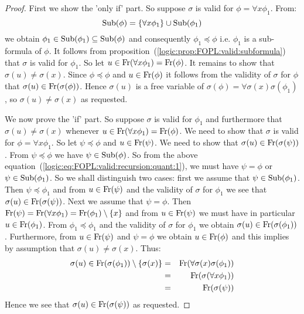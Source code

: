 \begin{proof}
First we show the 'only if' part. So suppose $\sigma$ is valid for
$\phi=\forall x\phi_{1}$. From:
    \begin{equation}\label{logic:eq:FOPL:valid:recursion:quant:1}
    \mbox{\rm Sub}(\phi)=\{\forall x\phi_{1}\}\cup\mbox{\rm Sub}(\phi_{1})
    \end{equation}
we obtain $\phi_{1}\in\mbox{\rm Sub}(\phi_{1})\subseteq\mbox{\rm Sub}(\phi)$ and
consequently $\phi_{1}\preceq\phi$ i.e. $\phi_{1}$ is a sub-formula
of $\phi$. It follows from
proposition~(\ref{logic:prop:FOPL:valid:subformula}) that $\sigma$
is valid for $\phi_{1}$. So let $u\in\mbox{\rm Fr}(\forall
x\phi_{1})=\mbox{\rm Fr}(\phi)$. It remains to show that
$\sigma(u)\neq\sigma(x)$. Since $\phi\preceq\phi$ and
$u\in\mbox{\rm Fr}(\phi)$ it follows from the validity of $\sigma$ for
$\phi$ that $\sigma(u)\in\mbox{\rm Fr}(\sigma(\phi))$. Hence $\sigma(u)$ is
a free variable of $\sigma(\phi)=\forall\sigma(x)\sigma(\phi_{1})$,
so $\sigma(u)\neq\sigma(x)$ as requested.

We now prove the 'if' part. So suppose $\sigma$ is valid for
$\phi_{1}$ and furthermore that $\sigma(u)\neq\sigma(x)$ whenever
$u\in\mbox{\rm Fr}(\forall x\phi_{1})=\mbox{\rm Fr}(\phi)$. We need to show that
$\sigma$ is valid for $\phi=\forall x\phi_{1}$. So let
$\psi\preceq\phi$ and $u\in\mbox{\rm Fr}(\psi)$. We need to show that
$\sigma(u)\in\mbox{\rm Fr}(\sigma(\psi))$. From $\psi\preceq\phi$ we have
$\psi\in\mbox{\rm Sub}(\phi)$. So from the above
equation~(\ref{logic:eq:FOPL:valid:recursion:quant:1}), we must have
$\psi=\phi$ or $\psi\in\mbox{\rm Sub}(\phi_{1})$. So we shall distinguish two
cases: first we assume that $\psi\in\mbox{\rm Sub}(\phi_{1})$. Then
$\psi\preceq\phi_{1}$ and from $u\in\mbox{\rm Fr}(\psi)$ and the validity of
$\sigma$ for $\phi_{1}$ we see that
$\sigma(u)\in\mbox{\rm Fr}(\sigma(\psi))$. Next we assume that $\psi=\phi$.
Then $\mbox{\rm Fr}(\psi) = \mbox{\rm Fr}(\forall x\phi_{1})=
\mbox{\rm Fr}(\phi_{1})\setminus\{x\}$ and from $u\in\mbox{\rm Fr}(\psi)$ we must
have in particular $u\in\mbox{\rm Fr}(\phi_{1})$. From
$\phi_{1}\preceq\phi_{1}$ and the validity of $\sigma$ for
$\phi_{1}$ we obtain $\sigma(u)\in\mbox{\rm Fr}(\sigma(\phi_{1}))$.
Furthermore, from $u\in\mbox{\rm Fr}(\psi)$ and $\psi=\phi$ we obtain
$u\in\mbox{\rm Fr}(\phi)$ and this implies by assumption that
$\sigma(u)\neq\sigma(x)$. Thus:
    \begin{eqnarray*}
    \sigma(u)\in\mbox{\rm Fr}(\sigma(\phi_{1}))\setminus\{\sigma(x)\}&=&
    \mbox{\rm Fr}(\forall\sigma(x)\sigma(\phi_{1}))\\
    &=&\mbox{\rm Fr}(\sigma(\forall x\phi_{1}))\\
    &=&\mbox{\rm Fr}(\sigma(\psi))
    \end{eqnarray*}
Hence we see that $\sigma(u)\in\mbox{\rm Fr}(\sigma(\psi))$ as requested.
\end{proof}

